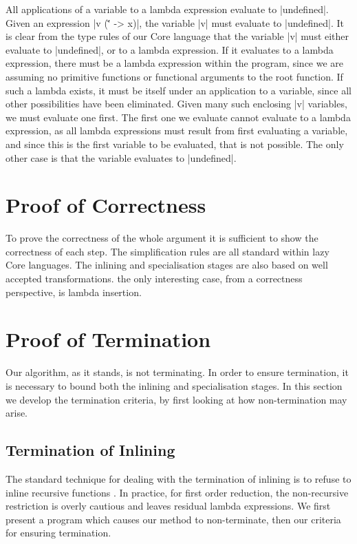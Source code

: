 \documentclass[preprint]{sigplanconf}
\begin{document}
\begin{lemma}{All applications of a variable to a lambda expression evaluate to |undefined|.}
Given an expression |v (\v' -> x)|, the variable |v| must evaluate to |undefined|. It is clear from the type rules of our Core language that the variable |v| must either evaluate to |undefined|, or to a lambda expression. If it evaluates to a lambda expression, there must be a lambda expression within the program, since we are assuming no primitive functions or functional arguments to the root function. If such a lambda exists, it must be itself under an application to a variable, since all other possibilities have been eliminated. Given many such enclosing |v| variables, we must evaluate one first. The first one we evaluate cannot evaluate to a lambda expression, as all lambda expressions must result from first evaluating a variable, and since this is the first variable to be evaluated, that is not possible. The only other case is that the variable evaluates to |undefined|.
\end{lemma}


\section{Proof of Correctness}

To prove the correctness of the whole argument it is sufficient to show the correctness of each step. The simplification rules are all standard within lazy Core languages. The inlining and specialisation stages are also based on well accepted transformations. the only interesting case, from a correctness perspective, is lambda insertion.



\section{Proof of Termination}
\label{sec:firstify_terminate}

Our algorithm, as it stands, is not terminating. In order to ensure termination, it is necessary to bound both the inlining and specialisation stages. In this section we develop the termination criteria, by first looking at how non-termination may arise.


\subsection{Termination of Inlining}

The standard technique for dealing with the termination of inlining is to refuse to inline recursive functions \cite{spj:inlining}. In practice, for first order reduction, the non-recursive restriction is overly cautious and leaves residual lambda expressions. We first present a program which causes our method to non-terminate, then our criteria for ensuring termination.
\end{document}
